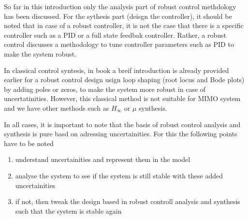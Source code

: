 So far in this introduction only the analysis part of robust control methdology has been discussed. For the sythesis part (deisgn the controller), it should be noted that in case of a robust controller, it is not the case that there is a specific controller such as a PID or a full state feedbak controller. Rather, a robust control discusses a methodology to tune controller parameters such as PID to make the system robust. 

In classical control syntesis, in book a breif introduction is already provided earlier for a robust control design usign loop shaping (root locus and Bode plots) by adding poles or zeros, to make the system more robust in case of uncertatinities. However, this classical method is not suitable for MIMO system and we have other methods such as $H_{\infty}$ or $\mu$ synthesis.

In all cases, it is important to note that the basis of robust control analysis and synthesis is pure basd on adressing uncertainities.  For this the following points have to be noted
\begin{enumerate}
	\item understand uncertainities and represent them in the model
	\item analyse the system to see if the system is still stable with these added uncertainities
	\item if not, then tweak the design based in robust controll analysis and synthesis such that the system is stable again
\end{enumerate}
